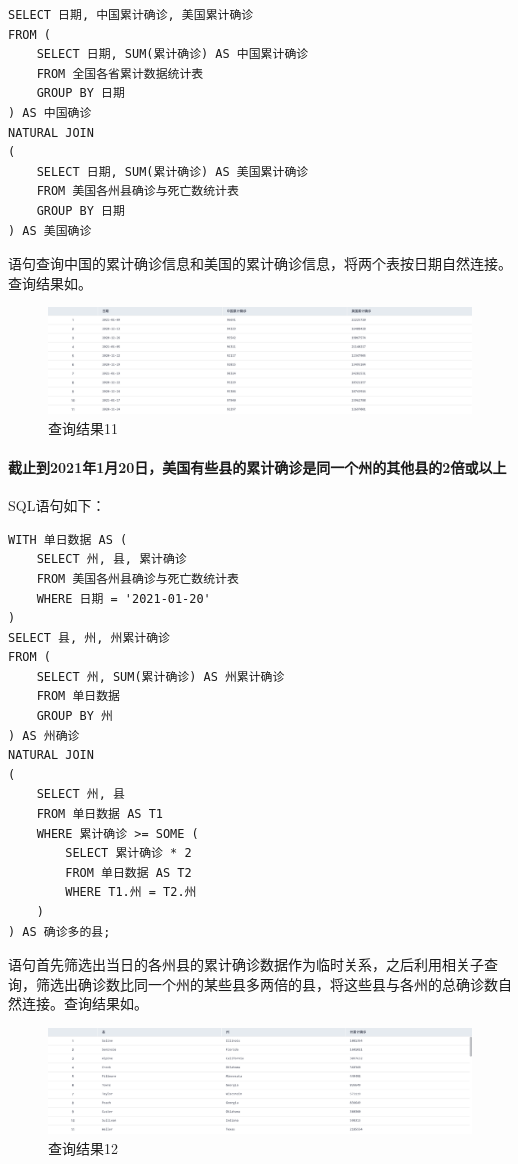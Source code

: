 \documentclass[lang=cn,11pt,a4paper,cite=authornum]{paper}
\begin{document}
\begin{code}
\begin{verbatim}
SELECT 日期, 中国累计确诊, 美国累计确诊
FROM (
    SELECT 日期, SUM(累计确诊) AS 中国累计确诊
    FROM 全国各省累计数据统计表
    GROUP BY 日期
) AS 中国确诊
NATURAL JOIN
(
    SELECT 日期, SUM(累计确诊) AS 美国累计确诊
    FROM 美国各州县确诊与死亡数统计表
    GROUP BY 日期
) AS 美国确诊
\end{verbatim}
\end{code}

语句查询中国的累计确诊信息和美国的累计确诊信息，将两个表按日期自然连接。查询结果如。

\begin{figure}[!htb]
    \centering
    \includegraphics[width=\textwidth]{./images/lab1_query11.png}
    \caption{查询结果11\label{fig:query11}}
\end{figure}

\paragraph{截止到2021年1月20日，美国有些县的累计确诊是同一个州的其他县的2倍或以上} SQL语句如下：

\begin{code}
\begin{verbatim}
WITH 单日数据 AS (
    SELECT 州, 县, 累计确诊
    FROM 美国各州县确诊与死亡数统计表
    WHERE 日期 = '2021-01-20'
)
SELECT 县, 州, 州累计确诊
FROM (
    SELECT 州, SUM(累计确诊) AS 州累计确诊
    FROM 单日数据
    GROUP BY 州
) AS 州确诊
NATURAL JOIN
(
    SELECT 州, 县
    FROM 单日数据 AS T1
    WHERE 累计确诊 >= SOME (
        SELECT 累计确诊 * 2
        FROM 单日数据 AS T2
        WHERE T1.州 = T2.州
    )
) AS 确诊多的县;
\end{verbatim}
\end{code}

语句首先筛选出当日的各州县的累计确诊数据作为临时关系，之后利用相关子查询，筛选出确诊数比同一个州的某些县多两倍的县，将这些县与各州的总确诊数自然连接。查询结果如。

\begin{figure}[!htb]
    \centering
    \includegraphics[width=\textwidth]{./images/lab1_query12.png}
    \caption{查询结果12\label{fig:query12}}
\end{figure}
\end{document}
